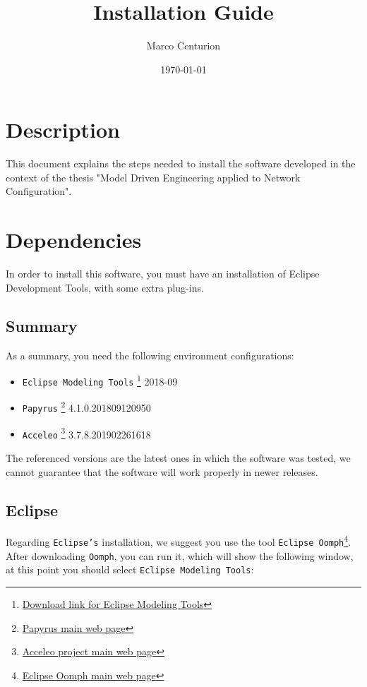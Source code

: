 \documentclass[11pt]{article}
\author{Marco Centurion}
\date{\today}
\title{Installation Guide}
\begin{document}
\maketitle
\tableofcontents

\section{Description}
\label{sec:org5c161cf}

This document explains the steps needed to install the software developed in the context of the thesis "Model Driven Engineering applied to Network Configuration".

\section{Dependencies}
\label{sec:org4b39ff3}

In order to install this software, you must have an installation of Eclipse Development Tools, with some extra plug-ins. 

\subsection{Summary}
\label{sec:org2f21645}

As a summary, you need the following environment configurations:

\begin{itemize}
\item \texttt{Eclipse Modeling Tools} \footnote{\href{https://www.eclipse.org/downloads/packages/release/2008-09/r/eclipse-modeling-tools}{Download link for Eclipse Modeling Tools}} 2018-09
\item \texttt{Papyrus} \footnote{\href{https://www.eclipse.org/papyrus/}{Papyrus main web page}} 4.1.0.201809120950
\item \texttt{Acceleo} \footnote{\href{https://www.eclipse.org/acceleo/}{Acceleo project main web page}} 3.7.8.201902261618
\end{itemize}

The referenced versions are the latest ones in which the software was tested, we cannot guarantee that the software will work properly in newer releases.

\subsection{Eclipse}
\label{sec:org721ce9f}

Regarding \texttt{Eclipse's} installation, we suggest you use the tool \texttt{Eclipse Oomph}\footnote{\href{https://projects.eclipse.org/projects/tools.oomph}{Eclipse Oomph main web page}}. After downloading \texttt{Oomph}, you can run it,
which will show the following window, at this point you should select \texttt{Eclipse Modeling Tools}:
\end{document}
